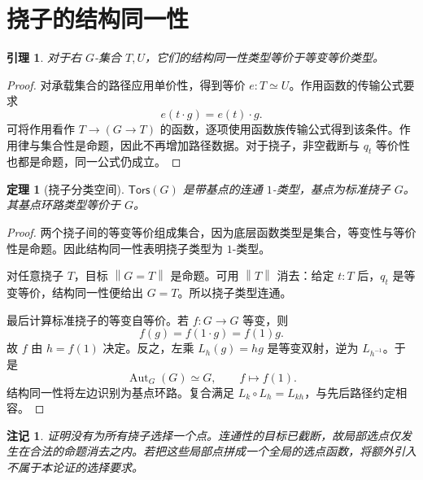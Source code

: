 \documentclass[12pt,oneside,openany,fontset=none]{ctexbook}
\theoremstyle{cn}
\newtheorem{lemma}[definition]{引理}
\newtheorem{theorem}[definition]{定理}
\newtheorem{remark}[definition]{注记}
\numberwithin{equation}{chapter}
\newcommand{\Aut}{\operatorname{Aut}}
\newcommand{\Tors}{\mathsf{Tors}}
\newcommand{\trunc}[1]{\left\|#1\right\|}
\begin{document}
\section{挠子的结构同一性}
\begin{lemma}
对于右 $G$-集合 $T,U$，它们的结构同一性类型等价于等变等价类型。
\end{lemma}
\begin{proof}
对承载集合的路径应用单价性，得到等价 $e:T\simeq U$。作用函数的传输公式要求
\[
e(t\cdot g)=e(t)\cdot g.
\]
可将作用看作 $T\to(G\to T)$ 的函数，逐项使用函数族传输公式得到该条件。作用律与集合性是命题，因此不再增加路径数据。对于挠子，非空截断与 $q_t$ 等价性也都是命题，同一公式仍成立。
\end{proof}
\begin{theorem}[挠子分类空间]\label{thm:torsor-BG}
$\Tors(G)$ 是带基点的连通 $1$-类型，基点为标准挠子 $G$。其基点环路类型等价于 $G$。
\end{theorem}
\begin{proof}
两个挠子间的等变等价组成集合，因为底层函数类型是集合，等变性与等价性是命题。因此结构同一性表明挠子类型为 $1$-类型。

对任意挠子 $T$，目标 $\trunc{G=T}$ 是命题。可用 $\trunc T$ 消去：给定 $t:T$ 后，$q_t$ 是等变等价，结构同一性便给出 $G=T$。所以挠子类型连通。

最后计算标准挠子的等变自等价。若 $f:G\to G$ 等变，则
\[
f(g)=f(1\cdot g)=f(1)g.
\]
故 $f$ 由 $h=f(1)$ 决定。反之，左乘 $L_h(g)=hg$ 是等变双射，逆为 $L_{h^{-1}}$。于是
\[
\Aut_G(G)\simeq G,
\qquad f\longmapsto f(1).
\]
结构同一性将左边识别为基点环路。复合满足 $L_k\circ L_h=L_{kh}$，与先后路径约定相容。
\end{proof}
\begin{remark}
证明没有为所有挠子选择一个点。连通性的目标已截断，故局部选点仅发生在合法的命题消去之内。若把这些局部点拼成一个全局的选点函数，将额外引入不属于本论证的选择要求。
\end{remark}
\end{document}
